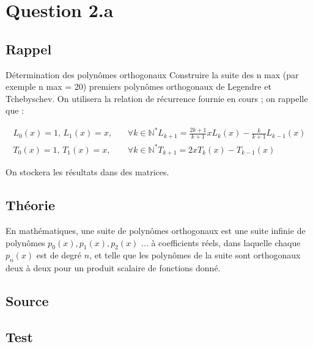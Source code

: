 \documentclass[a4paper,10pt]{report}
\newcommand{\N}{\mathbb{N}}
\begin{document}
\section*{Question 2.a}

\subsection*{Rappel}

Détermination des polynômes orthogonaux Construire la suite des n max (par exemple n max = 20) premiers polynômes orthogonaux de Legendre et Tchebyschev. On utilisera la relation de récurrence fournie en cours ; on rappelle que :

\begin{eqnarray*}
L_0 (x) = 1 \text{, }L_1 (x) = x \text{, } &&\forall k \in \N^* L_{k+1} = \frac{2k+1}{k+1}xL_k (x) - \frac{k}{k+1}L_{k-1}(x)\\
T_0 (x) = 1 \text{, }T_1 (x) = x \text{, } &&\forall k \in \N^* T_{k+1} = 2xT_k (x) - T_{k-1}(x)
\end{eqnarray*}

On stockera les résultats dans des matrices.

\subsection*{Théorie}

En mathématiques, une suite de polynômes orthogonaux est une suite infinie de polynômes $p_0(x), p_1(x), p_2(x)$ ... à coefficients réels, dans laquelle chaque $p_n(x)$ est de degré $n$, et telle que les polynômes de la suite sont orthogonaux deux à deux pour un produit scalaire de fonctions donné.

\subsection*{Source}

\begin{center}
	
	
\end{center}

\subsection*{Test}
\end{document}
